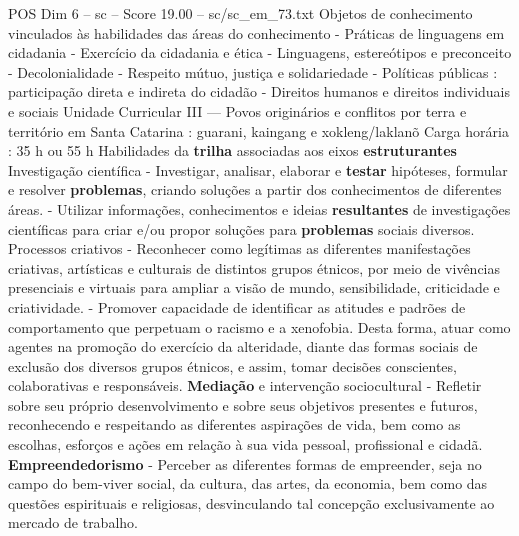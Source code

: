 \begin{textsample}{POS Dim 6 – sc – Score 19.00 – sc/sc\_em\_73.txt}
Objetos de conhecimento vinculados às habilidades das áreas do conhecimento - Práticas de linguagens em cidadania - Exercício da cidadania e ética - Linguagens, estereótipos e preconceito - Decolonialidade - Respeito mútuo, justiça e solidariedade - Políticas públicas : participação direta e indireta do cidadão - Direitos humanos e direitos individuais e sociais Unidade Curricular III — Povos originários e conflitos por terra e território em Santa Catarina : guarani, kaingang e xokleng/laklanõ Carga horária : 35 h ou 55 h Habilidades da \textbf{trilha} associadas aos eixos \textbf{estruturantes} Investigação científica - Investigar, analisar, elaborar e \textbf{testar} hipóteses, formular e resolver \textbf{problemas}, criando soluções a partir dos conhecimentos de diferentes áreas. - Utilizar informações, conhecimentos e ideias \textbf{resultantes} de investigações científicas para criar e/ou propor soluções para \textbf{problemas} sociais diversos.
Processos criativos - Reconhecer como legítimas as diferentes manifestações criativas, artísticas e culturais de distintos grupos étnicos, por meio de vivências presenciais e virtuais para ampliar a visão de mundo, sensibilidade, criticidade e criatividade. - Promover capacidade de identificar as atitudes e padrões de comportamento que perpetuam o racismo e a xenofobia.
Desta forma, atuar como agentes na promoção do exercício da alteridade, diante das formas sociais de exclusão dos diversos grupos étnicos, e assim, tomar decisões conscientes, colaborativas e responsáveis. \textbf{Mediação} e intervenção sociocultural - Refletir sobre seu próprio desenvolvimento e sobre seus objetivos presentes e futuros, reconhecendo e respeitando as diferentes aspirações de vida, bem como as escolhas, esforços e ações em relação à sua vida pessoal, profissional e cidadã. \textbf{Empreendedorismo} - Perceber as diferentes formas de empreender, seja no campo do bem-viver social, da cultura, das artes, da economia, bem como das questões espirituais e religiosas, desvinculando tal concepção exclusivamente ao mercado de trabalho.

\end{textsample}
